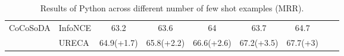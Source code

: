 \begin{table*}[h]
\begin{tabular}{@{}lllcccccc@{}}
\multirow{2}{*}{CoCoSoDA} 
& InfoNCE                   & \multicolumn{1}{c}{63.2}             & \multicolumn{1}{c}{63.6}          
                            & \multicolumn{1}{c}{64}             & \multicolumn{1}{c}{63.7}          
                            & \multicolumn{1}{c}{64.7}                    
                            \\ \cmidrule(l){2-7} 
& URECA                     & \multicolumn{1}{c}{64.9(+1.7)}          & \multicolumn{1}{c}{65.8(+2.2)}          
                            & \multicolumn{1}{c}{66.6(+2.6)}          & \multicolumn{1}{c}{67.2(+3.5)}          
                            & \multicolumn{1}{c}{67.7(+3)}                   
                            \\ \bottomrule 
\end{tabular}
\caption{Results of Python across different number of few shot examples (MRR).}
\label{CSN_Python}
\end{table*}

